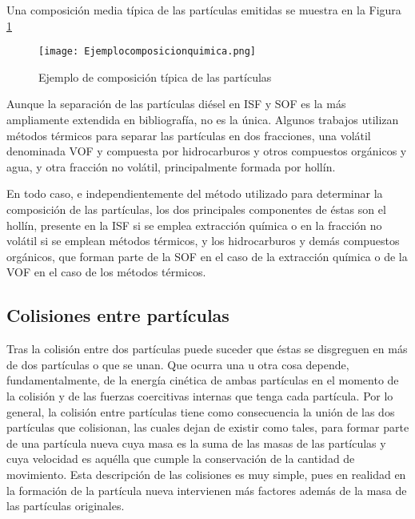 \par Una composición media típica de las partículas emitidas se muestra en la Figura \ref{fig:ejemplocomposiciontipicaparticulas}

\begin{figure}[ht]
\centering
	\texttt{[image: Ejemplocomposicionquimica.png]}	 
	\caption{Ejemplo de composición típica de las partículas} \label{fig:ejemplocomposiciontipicaparticulas}
\end{figure} 

\par Aunque la separación de las partículas diésel en ISF y SOF es la más ampliamente extendida en bibliografía, no es la única. Algunos trabajos utilizan métodos térmicos para separar las partículas en dos fracciones, una volátil denominada VOF y compuesta por hidrocarburos y otros compuestos orgánicos y agua, y otra fracción no volátil, principalmente formada por hollín.

\par En todo caso, e independientemente del método utilizado para determinar la composición de las partículas, los dos principales componentes de éstas son el hollín, presente en la ISF si se emplea extracción química o en la fracción no volátil si se emplean métodos térmicos, y los hidrocarburos y demás compuestos orgánicos, que forman parte de la SOF en el caso de la extracción química o de la VOF en el caso de los métodos térmicos.

\subsection{Colisiones entre partículas} \label{subsec:colisiones}

\par Tras la colisión entre dos partículas puede suceder que éstas se disgreguen en más de dos partículas o que se unan. Que ocurra una u otra cosa depende, fundamentalmente, de la energía cinética de ambas partículas en el momento de la colisión y de las fuerzas coercitivas internas que tenga cada partícula. Por lo general, la colisión entre partículas tiene como consecuencia la unión de las dos partículas que colisionan, las cuales dejan de existir como tales, para formar parte de una partícula nueva cuya masa es la suma de las masas de las partículas y cuya velocidad es aquélla que cumple la conservación de la cantidad de movimiento. Esta descripción de las colisiones es muy simple, pues en realidad en la formación de la partícula nueva intervienen más factores además de la masa de las partículas originales.

